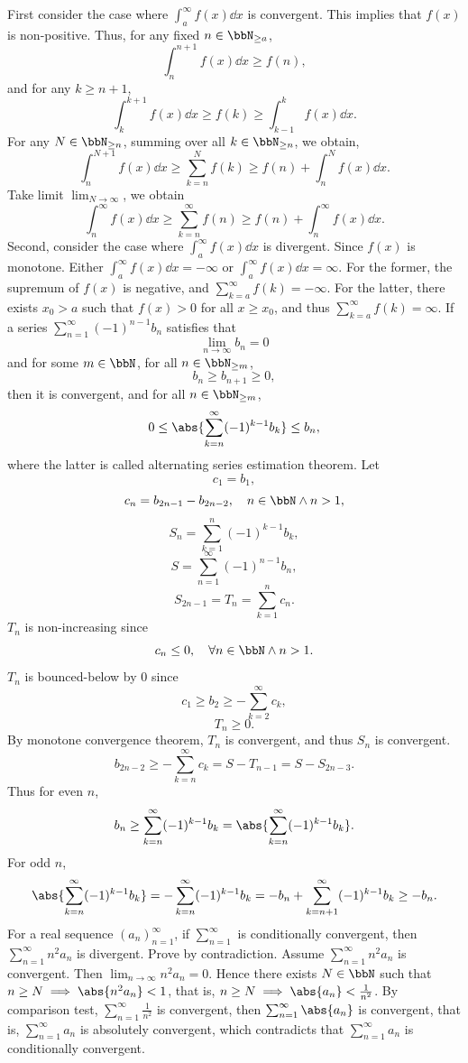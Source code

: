 First consider the case where $\int_a^{\infty}f(x)\dd{x}$ is convergent. This implies that $f(x)$ is non-positive. Thus, for any fixed $n\in\bbN_{\ge a}$,
\[\int_n^{n+1}f(x)\dd{x}\ge f(n),\]
and for any $k\geq n+1$,
\[\int_k^{k+1}f(x)\dd{x}\ge f(k)\ge\int_{k-1}^kf(x)\dd{x}.\]
For any $N\in\bbN_{\ge n}$, summing over all $k\in\bbN_{\ge n}$, we obtain, 
\[\int_n^{N+1}f(x)\dd{x}\ge\sum_{k=n}^Nf(k)\ge f(n)+\int_n^Nf(x)\dd{x}.\]
Take limit $\lim_{N\to\infty}$, we obtain
\[\int_n^{\infty}f(x)\dd{x}\ge\sum_{k=n}^{\infty}f(n)\ge f(n)+\int_n^{\infty}f(x)\dd{x}.\]
Second, consider the case where $\int_a^{\infty}f(x)\dd{x}$ is divergent. Since $f(x)$ is monotone. Either $\int_a^{\infty}f(x)\dd{x}=-\infty$ or $\int_a^{\infty}f(x)\dd{x}=\infty$. For the former, the supremum of $f(x)$ is negative, and $\sum_{k=a}^{\infty}f(k)=-\infty$. For the latter, there exists $x_0>a$ such that $f(x)>0$ for all $x\ge x_0$, and thus $\sum_{k=a}^{\infty}f(k)=\infty$.
\epr
{}
If a series $\sum_{n=1}^{\infty}(-1)^{n-1}b_n$ satisfies that
\[\lim_{n\to\infty}b_n=0\]
and for some $m\in\bbN$, for all $n\in\bbN_{\ge m}$,
\[b_n\geq b_{n+1}\geq 0,\]
then it is convergent, and for all $n\in\bbN_{\ge m}$,
\[0\leq\abs{\sum_{k=n}^{\infty}(-1)^{k-1}b_k}\leq b_n,\]
where the latter is called alternating series estimation theorem.
\bpr
Let
\[c_1=b_1,\]
\[c_n=b_{2n-1}-b_{2n-2},\quad n\in\bbN\land n>1,\]
\[S_n=\sum_{k=1}^n(-1)^{k-1}b_k,\]
\[S=\sum_{n=1}^{\infty}(-1)^{n-1}b_n,\]
\[S_{2n-1}=T_n=\sum_{k=1}^nc_n.\]
$T_n$ is non-increasing since
\[c_n\leq 0,\quad\forall n\in\bbN\land n>1.\]
$T_n$ is bounced-below by $0$ since
\[c_1\geq b_2\geq-\sum_{k=2}^{\infty}c_k,\]
\[T_n\geq 0.\]
By monotone convergence theorem, $T_n$ is convergent, and thus $S_n$ is convergent.
\[b_{2n-2}\geq-\sum_{k=n}^{\infty}c_k=S-T_{n-1}=S-S_{2n-3}.\]
Thus for even $n$,
\[b_n\geq\sum_{k=n}^{\infty}(-1)^{k-1}b_k=\abs{\sum_{k=n}^{\infty}(-1)^{k-1}b_k}.\]
For odd $n$,
\[\abs{\sum_{k=n}^{\infty}(-1)^{k-1}b_k}=-\sum_{k=n}^{\infty}(-1)^{k-1}b_k=-b_n+\sum_{k=n+1}^{\infty}(-1)^{k-1}b_k\geq -b_n.\]
\epr
{}
For a real sequence $(a_n)_{n=1}^{\infty}$, if $\sum_{n=1}^{\infty}$ is conditionally convergent, then $\sum_{n=1}^{\infty}n^2a_n$ is divergent.
\bpr
Prove by contradiction. Assume $\sum_{n=1}^{\infty}n^2a_n$ is convergent. Then $\lim_{n\to\infty}n^2a_n=0$. Hence there exists $N\in\bbN$ such that $n\ge N\implies\abs{n^2a_n}<1$, that is, $n\ge N\implies\abs{a_n}<\frac{1}{n^2}$. By comparison test, $\sum_{n=1}^{\infty}\frac{1}{n^2}$ is convergent, then $\sum_{n=1}^{\infty}\abs{a_n}$ is convergent, that is, $\sum_{n=1}^{\infty}a_n$ is absolutely convergent, which contradicts that $\sum_{n=1}^{\infty}a_n$ is conditionally convergent.
